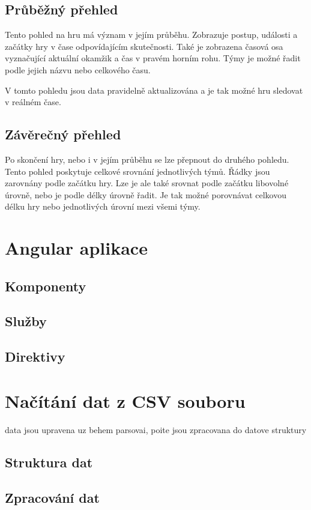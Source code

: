 \documentclass[
  digital, %
  oneside, %
  table,   %
  nolof,     %
  nolot,     %
]{fithesis3}
\begin{document}
\subsection{Průběžný přehled}
Tento pohled na hru má význam v jejím průběhu. Zobrazuje postup, události a začátky hry v čase odpovídajícím skutečnosti. Také je zobrazena časová osa vyznačující aktuální okamžik a čas v pravém horním rohu. Týmy je možné řadit podle jejich názvu nebo celkového času.\par
V tomto pohledu jsou data pravidelně aktualizována a je tak možné hru sledovat v reálném čase.
\subsection{Závěrečný přehled}
Po skončení hry, nebo i v jejím průběhu se lze přepnout do druhého pohledu. Tento pohled poskytuje celkové srovnání jednotlivých týmů. Řádky jsou zarovnány podle začátku hry. Lze je ale také srovnat podle začátku libovolné úrovně, nebo je podle délky úrovně řadit. Je tak možné porovnávat celkovou délku hry nebo jednotlivých úrovní mezi všemi týmy.


\section{Angular aplikace}
\subsection{Komponenty}
\subsection{Služby}
\subsection{Direktivy}

\section{Načítání dat z CSV souboru}
data jsou upravena uz behem parsovai, poite jsou zpracovana do datove struktury
\subsection{Struktura dat}
\subsection{Zpracování dat}
\end{document}
